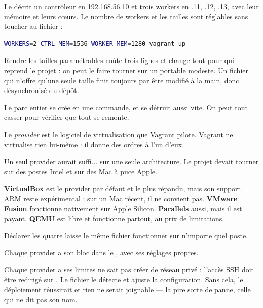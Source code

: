 \role
Le  décrit un contrôleur en 192.168.56.10 et trois workers
en .11, .12, .13, avec leur mémoire et leurs cœurs. Le nombre de workers et les
tailles sont réglables sans toucher au fichier :

\begin{lstlisting}[language=bash]
WORKERS=2 CTRL_MEM=1536 WORKER_MEM=1280 vagrant up
\end{lstlisting}

\begin{retenir}
Rendre les tailles paramétrables coûte trois lignes et change tout pour qui
reprend le projet : on peut le faire tourner sur un portable modeste. Un fichier
qui n'offre qu'une seule taille finit toujours par être modifié à la main, donc
désynchronisé du dépôt.
\end{retenir}

\apport
Le parc entier se crée en une commande, et se détruit aussi vite. On peut tout
casser pour vérifier que tout se remonte.


\quoi
Le \emph{provider} est le logiciel de virtualisation que Vagrant pilote. Vagrant
ne virtualise rien lui-même : il donne des ordres à l'un d'eux.

\pourquoi
Un seul provider aurait suffi... sur une seule architecture. Le projet devait
tourner sur des postes Intel et sur des Mac à puce Apple.

\textbf{VirtualBox} est le provider par défaut et le plus répandu, mais son
support ARM reste expérimental : sur un Mac récent, il ne convient pas.
\textbf{VMware Fusion} fonctionne nativement sur Apple Silicon.
\textbf{Parallels} aussi, mais il est payant. \textbf{QEMU} est libre et
fonctionne partout, au prix de limitations.

Déclarer les quatre laisse le même fichier fonctionner sur n'importe quel poste.

\role
Chaque provider a son bloc dans le , avec ses réglages
propres.

\begin{piege}{Chaque provider a ses limites}
 ne sait pas créer de réseau privé : l'accès SSH doit être
redirigé sur . Le fichier le détecte et ajuste la configuration.
Sans cela, le déploiement réussirait et rien ne serait joignable --- la pire
sorte de panne, celle qui ne dit pas son nom.
\end{piege}

